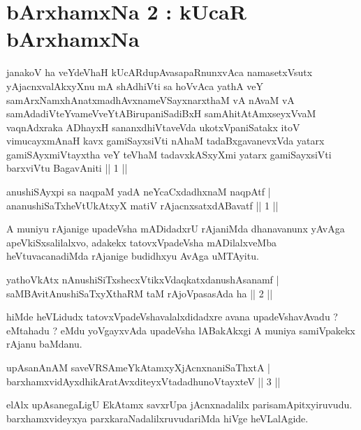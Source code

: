 \chapter{bArxhamxNa 2 : kUcaR bArxhamxNa}
\begin{kandikeshl}
janakoV ha veYdeVhaH kUcARdupAvasapaRnunxvAca namasetxV\s sutx yAjacnxvalAkxyXnu mA shAdhiVti sa hoVvAca yathA veY samArxNamxhAnatxmadhAvxnameVSayxnarxthaM vA nAvaM vA samAdadiVteYvameVveYtABirupaniSadiBxH samAhitAtAmxseyxVvaM vaqnAdxraka ADhayxH sananxdhiVtaveVda ukotxVpaniSatakx itoV vimucayxmAnaH kavx gamiSayxsiVti nAhaM tadaBxgavanevxVda yatarx gamiSAyxmiVtayxtha veY teV\s haM tadavxkASxyXmi yatarx gamiSayxsiVti barxviVtu BagavAniti || 1 ||
\end{kandikeshl}	
	
\begin{shl}
anushiSAyxpi sa naqpaM yadA neYcaCxdadhxnaM naqpAtf |\\
ananushiSaTxheVtUkAtxyX matiV rAjacnxsatxdA\s Bavatf \hfill || 1 || 
\end{shl}

\begin{artha}
A muniyu rAjanige upadeVsha mADidadxrU rAjaniMda dhanavanunx yAvAga apeVkiSxsalilalxvo, adakekx tatovxVpadeVsha mADilalxveMba heVtuvacanadiMda rAjanige budidhxyu AvAga uMTAyitu.
\end{artha}

\begin{shl}
yathoVkAtx nAnushiSiTxshecxVtikxVdaqkatxdanushAsanamf |\\
saMBAvitAnushiSaTxyXthaRM taM rAjoVpasasAda ha \hfill || 2 || 
\end{shl}

\begin{artha}
hiMde heVLidudx tatovxVpadeVshavalalxdidadxre avana upadeVshavAvadu ? eMtahadu ? eMdu yoVgayxvAda upadeVsha lABakAkxgi A muniya samiVpakekx rAjanu baMdanu.
\end{artha}

\begin{shl}
upAsanAnAM saveVRSAmeYkAtamxyXjAcnxnaniSaThxtA |\\
barxhamxvidAyxdhikAratAvxditeyxVtadadhunoVtayxteV \hfill || 3 || 
\end{shl}

\begin{artha}
elAlx upAsanegaLigU EkAtamx savxrUpa jAcnxnadalilx parisamApitxyiruvudu. barxhamxvideyxya parxkaraNadalilxruvudariMda hiVge heVLalAgide.
\end{artha}

